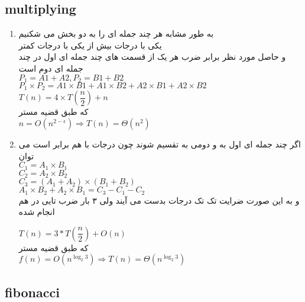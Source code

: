 \documentclass[a4paper]{article}
\begin{document}
\begin{latin}
\section*{multiplying}
\end{latin}
\begin{enumerate}

\item{}
به طور مشابه هر چند جمله ای را به دو بخش می شکنیم\\
یکی با درجات بیش از 
یکی با درجات کمتر\\
و حاصل مورد نظر برابر ضرب هر یک از قسمت های چند جمله ای اول در چند 
جمله ای دوم است\\

$P_1 = A1 + A2, P_2 = B1 + B2$\\
$P_1 \times P_2 = A1 \times B1 + A1 \times B2 + A2 \times B1 + A2 \times B2$\\


$T(n) = 4\times T(\dfrac{n}{2}) + n$\\

که طبق قضیه مستر\\

$n = O(n^{2-\epsilon}) \Rightarrow T(n) = \Theta(n^2) $
\\
\item{}
اگر چند جمله ای اول به 
و دومی به 
تقسیم شوند
چون درجات 
با هم برابر است می توان \\

$C_1 = A_1 \times B_1$\\
$C_2 = A_2 \times B_2$\\
$C_3 = (A_1 + A_2) \times (B_1 + B_2)$\\
$A_1 \times B_2 + A_2 \times B_1 = C_3 - C_1 - C_2$\\
و به این صورت ضرایت تک تک درجات بدست می آیند ولی ۳ بار ضرب 
تایی در هم انجام شده

$T(n) = 3*T(\dfrac{n}{2}) + O(n)$
\\
که طبق قضیه مستر\\
$f(n) = O(n^{\log_{2}{3}}) \Rightarrow T(n) = \Theta (n^{\log_2{3}}) $

\end{enumerate}
\newpage
\begin{latin}
\section*{fibonacci}
\end{latin}
\end{document}
